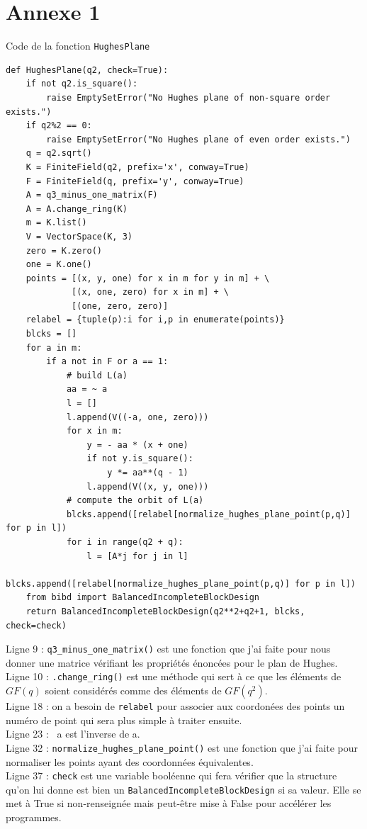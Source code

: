 \documentclass[a4paper]{article}
\begin{document}
\newpage
\thispagestyle{empty}
\section*{Annexe 1}
Code de la fonction \texttt{HughesPlane}
\begin{lstlisting}
def HughesPlane(q2, check=True):
    if not q2.is_square():
        raise EmptySetError("No Hughes plane of non-square order exists.")
    if q2%2 == 0:
        raise EmptySetError("No Hughes plane of even order exists.")
    q = q2.sqrt()
    K = FiniteField(q2, prefix='x', conway=True)
    F = FiniteField(q, prefix='y', conway=True)
    A = q3_minus_one_matrix(F)
    A = A.change_ring(K)
    m = K.list()
    V = VectorSpace(K, 3)
    zero = K.zero()
    one = K.one()
    points = [(x, y, one) for x in m for y in m] + \
             [(x, one, zero) for x in m] + \
             [(one, zero, zero)]
    relabel = {tuple(p):i for i,p in enumerate(points)}
    blcks = []
    for a in m:
        if a not in F or a == 1:
            # build L(a)
            aa = ~ a
            l = []
            l.append(V((-a, one, zero)))
            for x in m:
                y = - aa * (x + one)
                if not y.is_square():
                    y *= aa**(q - 1)
                l.append(V((x, y, one)))
            # compute the orbit of L(a)
            blcks.append([relabel[normalize_hughes_plane_point(p,q)] for p in l])
            for i in range(q2 + q):
                l = [A*j for j in l]
                blcks.append([relabel[normalize_hughes_plane_point(p,q)] for p in l])
    from bibd import BalancedIncompleteBlockDesign
    return BalancedIncompleteBlockDesign(q2**2+q2+1, blcks, check=check)
\end{lstlisting}
\bigskip
Ligne 9 : \texttt{q3\_minus\_one\_matrix()} est une fonction que j'ai faite pour nous donner une matrice vérifiant les propriétés énoncées pour le plan de Hughes. \smallskip\\
Ligne 10 : \texttt{.change\_ring()} est une méthode qui sert à ce que les éléments de $GF(q)$ soient considérés comme des éléments de $GF(q^2)$.\smallskip\\
Ligne 18 : on a besoin de \texttt{relabel} pour associer aux coordonées des points un numéro de point qui sera plus simple à traiter ensuite.\smallskip\\
Ligne 23 : ~a est l'inverse de a.\smallskip\\
Ligne 32 : \texttt{normalize\_hughes\_plane\_point()} est une fonction que j'ai faite pour normaliser les points ayant des coordonnées équivalentes.\smallskip\\
Ligne 37 : \texttt{check} est une variable booléenne qui fera vérifier que la structure qu'on lui donne est bien un \texttt{BalancedIncompleteBlockDesign} si sa valeur. Elle se met à True si non-renseignée mais peut-être mise à False pour accélérer les programmes.
\newpage
\thispagestyle{empty}
\end{document}

